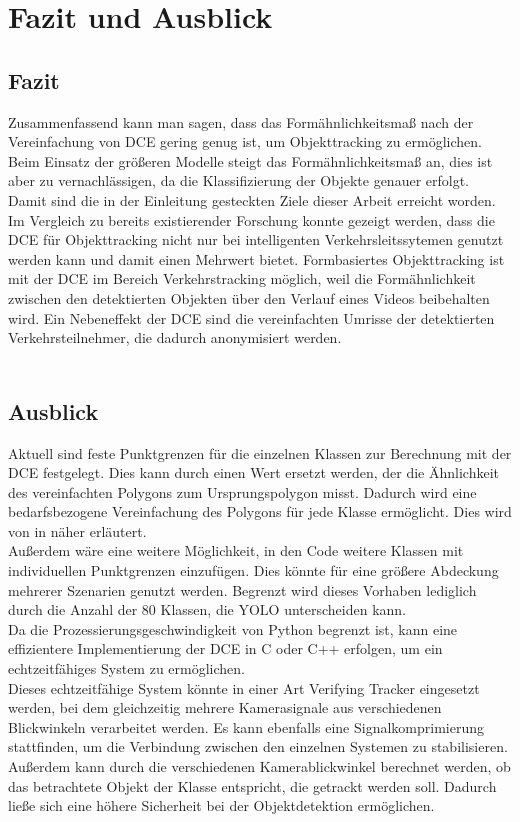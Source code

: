 \chapter{Fazit und Ausblick}
\label{ch:conclusion}
\section{Fazit}
{ 
    Zusammenfassend kann man sagen, dass das Formähnlichkeitsmaß nach der Vereinfachung von DCE gering genug ist, um Objekttracking zu ermöglichen. Beim Einsatz der größeren Modelle steigt das Formähnlichkeitsmaß an, dies ist aber zu vernachlässigen, da die Klassifizierung der Objekte genauer erfolgt.  Damit sind die in der Einleitung gesteckten Ziele dieser Arbeit erreicht worden. \\
	Im Vergleich zu bereits existierender Forschung konnte gezeigt werden, dass die DCE für Objekttracking nicht nur bei intelligenten Verkehrsleitssytemen genutzt werden kann und damit einen Mehrwert bietet. Formbasiertes Objekttracking ist mit der DCE im Bereich Verkehrstracking möglich, weil die Formähnlichkeit zwischen den detektierten Objekten über den Verlauf eines Videos beibehalten wird. Ein Nebeneffekt der DCE sind die vereinfachten Umrisse der detektierten Verkehrsteilnehmer, die dadurch anonymisiert werden. \\
\\
	

    }
\section{Ausblick}
{
	Aktuell sind feste Punktgrenzen für die einzelnen Klassen zur Berechnung mit der DCE festgelegt. Dies kann durch einen Wert ersetzt werden, der die Ähnlichkeit des vereinfachten Polygons zum Ursprungspolygon misst. Dadurch wird eine bedarfsbezogene Vereinfachung des Polygons für jede Klasse ermöglicht. Dies wird von \citeauthor{Latecki2003} in  \citep{Latecki2003} näher erläutert. \\
	Außerdem wäre eine weitere Möglichkeit, in den Code weitere Klassen mit individuellen Punktgrenzen einzufügen. Dies könnte für eine größere Abdeckung mehrerer Szenarien genutzt werden. Begrenzt wird dieses Vorhaben lediglich durch die Anzahl der 80 Klassen, die YOLO unterscheiden kann. \\
	Da die Prozessierungsgeschwindigkeit von Python begrenzt ist, kann eine effizientere Implementierung der DCE in C oder C++ erfolgen, um ein echtzeitfähiges System zu ermöglichen. \\
	Dieses echtzeitfähige System könnte in einer Art \glqq Verifying Tracker\grqq{} eingesetzt werden, bei dem gleichzeitig mehrere Kamerasignale aus verschiedenen Blickwinkeln verarbeitet werden. Es kann ebenfalls eine Signalkomprimierung stattfinden, um die Verbindung zwischen den einzelnen Systemen zu stabilisieren.  Außerdem kann durch die verschiedenen Kamerablickwinkel berechnet werden, ob das betrachtete Objekt der Klasse entspricht, die getrackt werden soll. Dadurch ließe sich eine höhere Sicherheit bei der Objektdetektion ermöglichen. 

}

